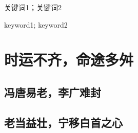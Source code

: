 \documentclass{QHUthesis}
\begin{document}
	
\renewcommand{\title}{The sunset is like a rustling duck, and the autumn water is like a long sky} %
\renewcommand{\biaoti}{落霞与孤鹜齐飞秋水共长天一色}  %
\renewcommand{\xueyuan}{机械工程学院}
\renewcommand{\zhuanye}{机械电子工程}
\renewcommand{\xingming}{coffeelize}
\renewcommand{\xuehao}{1700417035}
\renewcommand{\grade}{2017级}
\renewcommand{\daoshi}{Coffeelze}
\renewcommand{\dateOfGrant}{2021年5月20日}
\renewcommand{\class}{本科生毕业论文} %
	

\frontmatter


\titlepage
\thispagestyle{empty} 
\statement
\clearpage
\clearpage
\thispagestyle{empty} 
\tableofcontents
\thispagestyle {empty}

\mainmatter %
\songti{} %

\begin{zhAbsract}{关键词1；关键词2}
	\zhlipsum[1]
\end{zhAbsract}
\begin{enAbsract}{keyword1; keyword2}
	\lipsum[1]
\end{enAbsract}


\chapter{时运不齐，命途多舛}
\section{冯唐易老，李广难封}
\zhlipsum[1-3]
\section{老当益壮，宁移白首之心}
\zhlipsum[1-5]

\begin{figure}[htbp]
	\centering
	\label{fig:1}
\end{figure}
\end{document}
